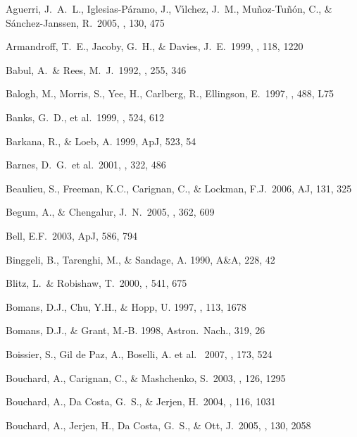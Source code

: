 \documentclass[12pt,preprint]{aastex}
\begin{document}
\begin{thebibliography}{}

Aguerri, J.~A.~L., Iglesias-P{\'a}ramo, J., V{\'{\i}}lchez, J.~M., 
Mu{\~n}oz-Tu{\~n}{\'o}n, C., \& S{\'a}nchez-Janssen, R.\ 2005, \aj, 130, 475 

Armandroff, T.~E., Jacoby, G.~H., \& Davies, J.~E.\ 1999, \aj, 118, 1220

Babul, A.~\& Rees, M.~J.\ 1992, \mnras, 255, 346 

Balogh, M., Morris, S., Yee, H., Carlberg, R., Ellingson, E.\ 1997, \apj, 488, L75 

Banks, G.~D., et al.\ 1999, \apj, 524, 612 

Barkana, R., \& Loeb, A. 1999, ApJ, 523, 54

Barnes, D.~G.~et al.\ 2001, \mnras, 322, 486 

Beaulieu, S., Freeman, K.C., Carignan, C., \&  Lockman, F.J.\ 2006, AJ, 131, 325 

Begum, A., \& Chengalur, J.~N.\ 2005, \mnras, 362, 609 

Bell, E.F.\ 2003, ApJ, 586, 794

Binggeli, B., Tarenghi, M., \& Sandage, A. 1990, A\&A, 228, 42

Blitz, L.~\& Robishaw, T.\ 2000, \apj, 541, 675 

Bomans, D.J., Chu, Y.H., \& Hopp, U. 1997, \aj , 113, 1678

Bomans, D.J., \& Grant, M.-B. 1998, Astron.\ Nach., 319, 26

Boissier, S., Gil de Paz, A., Boselli, A. et al. \ 2007, \apj, 173, 524 

Bouchard, A., Carignan, C., \& Mashchenko, S.\ 2003, \aj, 126, 1295 

Bouchard, A., Da Costa, G.~S., \& Jerjen, H.\ 2004, \pasp, 116, 1031 

Bouchard, A., Jerjen, H., Da Costa, G.~S., \& Ott, J.\ 2005, \aj, 130, 2058 


\end{thebibliography}
\end{document}
